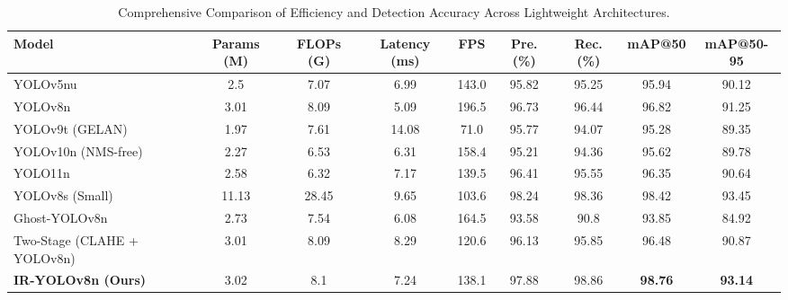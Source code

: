 \begin{table}[tb]
\centering
\caption{Comprehensive Comparison of Efficiency and Detection Accuracy Across Lightweight Architectures.}
\label{tab:overall_performance}
\scriptsize
\begin{tabular}{lcccccccc}
\toprule
\textbf{Model} & \textbf{Params (M)} & \textbf{FLOPs (G)} & \textbf{Latency (ms)} & \textbf{FPS} & \textbf{Pre. (\%)} & \textbf{Rec. (\%)} & \textbf{mAP@50} & \textbf{mAP@50-95} \\
\midrule
YOLOv5nu & 2.5 & 7.07 & 6.99 & 143.0 & 95.82 & 95.25 & 95.94 & 90.12 \\
YOLOv8n & 3.01 & 8.09 & 5.09 & 196.5 & 96.73 & 96.44 & 96.82 & 91.25 \\
YOLOv9t (GELAN) & 1.97 & 7.61 & 14.08 & 71.0 & 95.77 & 94.07 & 95.28 & 89.35 \\
YOLOv10n (NMS-free) & 2.27 & 6.53 & 6.31 & 158.4 & 95.21 & 94.36 & 95.62 & 89.78 \\
YOLO11n & 2.58 & 6.32 & 7.17 & 139.5 & 96.41 & 95.55 & 96.35 & 90.64 \\
YOLOv8s (Small) & 11.13 & 28.45 & 9.65 & 103.6 & 98.24 & 98.36 & 98.42 & 93.45 \\
Ghost-YOLOv8n & 2.73 & 7.54 & 6.08 & 164.5 & 93.58 & 90.8 & 93.85 & 84.92 \\
Two-Stage (CLAHE + YOLOv8n) & 3.01 & 8.09 & 8.29 & 120.6 & 96.13 & 95.85 & 96.48 & 90.87 \\
\textbf{IR-YOLOv8n (Ours)} & 3.02 & 8.1 & 7.24 & 138.1 & 97.88 & 98.86 & \textbf{98.76} & \textbf{93.14} \\
\bottomrule
\end{tabular}
\end{table}
